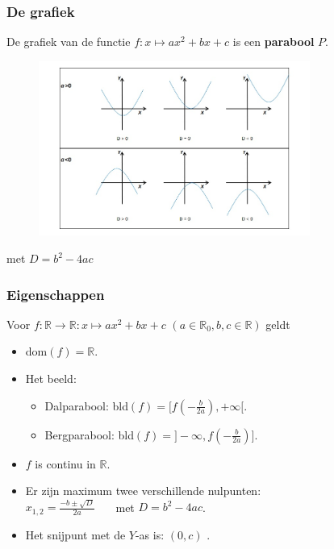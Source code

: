 \begin{frame}
\frametitle{ De grafiek}
De grafiek van de functie $f:x\mapsto ax^2+bx+c$ is een {\bfseries parabool} $P$.\\
\begin{figure}[htb]
\begin{center}
\includegraphics[width=3.5in]{figuren/parabool.jpg}
\end{center}
\end{figure}
met $D=b^2-4ac$
\end{frame}

\begin{frame}
\frametitle{Eigenschappen}
\pause
\begin{eigenschap}
Voor $f:\mathbb{R}\rightarrow \mathbb{R}:x\mapsto ax^2+bx+c$ $(a \in \mathbb{R}_0, b,c\in \mathbb{R})$ geldt
\begin{itemize}
\item dom$(f)=\mathbb{R}$.
\item Het beeld:
      \begin{itemize}
      \item Dalparabool: bld$(f)=[f(-\frac{b}{2a}),+\infty[$.
      \item Bergparabool: bld$(f)=]-\infty,f(-\frac{b}{2a})]$.
      \end{itemize}
\item $f$ is continu in $\mathbb{R}$.
\item Er zijn maximum twee verschillende nulpunten: \\
      $\displaystyle x_{1,2}=\frac{-b\pm \sqrt{D}}{2a}$~~~ met $D=b^2-4ac$.
\item Het snijpunt met de $Y$-as is:
      $(0,c)$ .
\end{itemize}
\end{eigenschap}
\end{frame}


